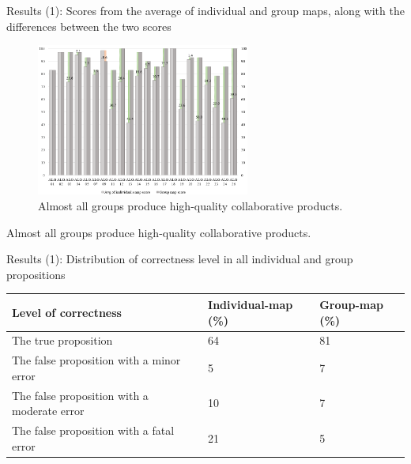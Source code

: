 \begin{frame}{Results (1): Scores from the average of individual and group maps, along with the differences between the two scores}

\begin{figure}[tb]
    \begin{center}
        \includegraphics[width=70mm]{images/rqa_map_score_distribution.png}
    \end{center}
    \caption{Almost all groups produce high-quality collaborative products.}
    \label{a1::mapscore_distribution}
\end{figure}

\begin{block}{}
    Almost all groups produce high-quality collaborative products.
\end{block}

\end{frame}

\begin{frame}{Results (1): Distribution of correctness level in all individual and group propositions}
\begin{table}[tb]
    \label{dist_correct}
    \begin{center}
        \begin{tabular}{ p{5cm}|p{2cm}|p{2cm}  }
            \hline
            Level of correctness & Individual-map (\%) & Group-map (\%)\\
            \hline
            The true proposition & 64 & 81 \\
            The false proposition with a minor error & 5 & 7 \\
            The false proposition with a moderate error & 10 & 7 \\
            The false proposition with a fatal error & 21 & 5 \\
            \hline
        \end{tabular}
    \end{center}
\end{table}
\end{frame}

